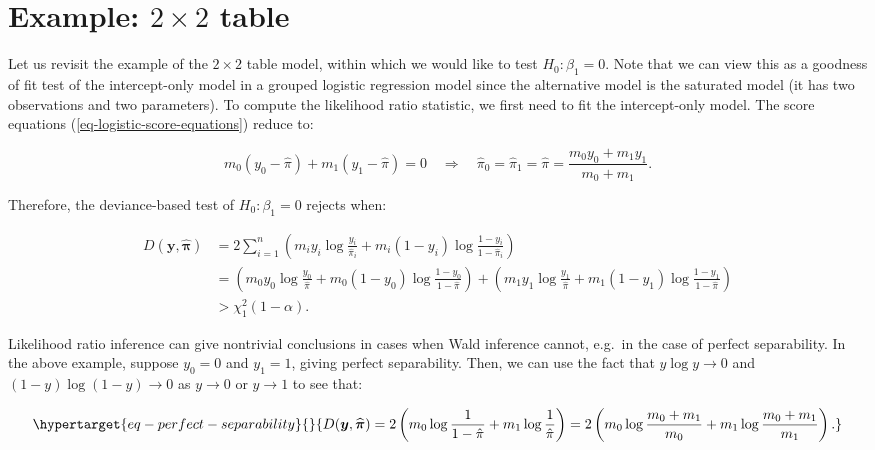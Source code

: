 \documentclass[
  11pt,
  letterpaper,
  oneside]{book}
\theoremstyle{plain}
\theoremstyle{plain}
\theoremstyle{definition}
\theoremstyle{definition}
\theoremstyle{plain}
\theoremstyle{remark}
\begin{document}
\hypertarget{sec-example-2x2-table}{%
\section{\texorpdfstring{Example: \(2 \times 2\)
table}{Example: 2 \textbackslash times 2 table}}\label{sec-example-2x2-table}}

Let us revisit the example of the \(2 \times 2\) table model, within
which we would like to test \(H_0: \beta_1 = 0\). Note that we can view
this as a goodness of fit test of the intercept-only model in a grouped
logistic regression model since the alternative model is the saturated
model (it has two observations and two parameters). To compute the
likelihood ratio statistic, we first need to fit the intercept-only
model. The score equations (\ref{eq-logistic-score-equations}) reduce
to:

\[
m_0 (y_0 - \hat \pi) + m_1 (y_1 - \hat \pi) = 0 \quad \Longrightarrow \quad \hat \pi_0 = \hat \pi_1 = \hat \pi = \frac{m_0 y_0 + m_1 y_1}{m_0 + m_1}.
\]

Therefore, the deviance-based test of \(H_0: \beta_1 = 0\) rejects when:

\[
\begin{split}
D(\boldsymbol{y}, \boldsymbol{\widehat \pi}) &= 2\sum_{i = 1}^n \left(m_i y_i \log \frac{y_i}{\widehat \pi_i} + m_i(1-y_i) \log\frac{1-y_i}{1-\widehat \pi_i}\right) \\
&= \left(m_0 y_0 \log\frac{y_0}{\hat \pi} + m_0(1-y_0)\log\frac{1-y_0}{1-\hat \pi}\right) + \left(m_1 y_1 \log\frac{y_1}{\hat \pi} + m_1(1-y_1)\log\frac{1-y_1}{1-\hat \pi}\right) \\
&> \chi^2_{1}(1-\alpha).
\end{split}
\]

Likelihood ratio inference can give nontrivial conclusions in cases when
Wald inference cannot, e.g.~in the case of perfect separability. In the
above example, suppose \(y_0 = 0\) and \(y_1 = 1\), giving perfect
separability. Then, we can use the fact that \(y \log y \rightarrow 0\)
and \((1-y)\log(1-y) \rightarrow 0\) as \(y \rightarrow 0\) or
\(y \rightarrow 1\) to see that:

\begin{equation}\protect\hypertarget{eq-perfect-separability}{}{
D(\boldsymbol{y}, \boldsymbol{\widehat \pi}) = 2\left(m_0 \log\frac{1}{1-\hat \pi} + m_1 \log\frac{1}{\hat \pi}\right) = 2\left(m_0 \log \frac{m_0 + m_1}{m_0} + m_1 \log \frac{m_0 + m_1}{m_1}\right).
}\label{eq-perfect-separability}\end{equation}
\end{document}

